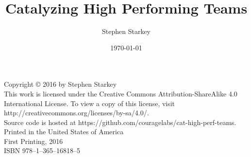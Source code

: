 \documentclass[12pt]{memoir}
\date{\today}
\title{Catalyzing High Performing Teams}
\author{Stephen Starkey}
\begin{document}
\frontmatter

\maketitle

\newpage

\noindent Copyright \copyright{} 2016 by Stephen Starkey \\ 

\noindent This work is licensed under the 
Creative Commons Attribution-ShareAlike 4.0 International License. To view a copy of this license, visit 
http://creativecommons.org/licenses/by-sa/4.0/. \\  

\noindent Source code is hosted at https://github.com/couragelabs/cat-high-perf-teams. \\ 

\noindent Printed in the United States of America \\ 

\noindent First Printing, 2016 \\ 

\noindent ISBN 978--1--365--16818--5

\newpage

\setcounter{secnumdepth}{1}
\setcounter{tocdepth}{1}
\tableofcontents
\newpage











\mainmatter




















\end{document}
